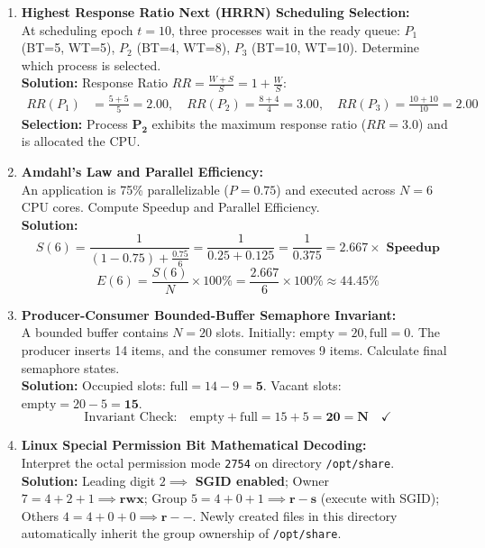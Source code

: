 \begin{enumerate}[label=\textbf{Problem \arabic*.},leftmargin=1.5cm]
\item \textbf{Highest Response Ratio Next (HRRN) Scheduling Selection:} \\
At scheduling epoch $t = 10$, three processes wait in the ready queue:
$P_1$ (BT=5, WT=5), $P_2$ (BT=4, WT=8), $P_3$ (BT=10, WT=10). Determine which process is selected. \\
\textbf{Solution:} Response Ratio $RR = \frac{W + S}{S} = 1 + \frac{W}{S}$:
\begin{align*}
RR(P_1) &= \frac{5 + 5}{5} = \mathbf{2.00}, \quad RR(P_2) = \frac{8 + 4}{4} = \mathbf{3.00}, \quad RR(P_3) = \frac{10 + 10}{10} = \mathbf{2.00}
\end{align*}
\textbf{Selection:} Process $\mathbf{P_2}$ exhibits the maximum response ratio ($RR = 3.0$) and is allocated the CPU.

\item \textbf{Amdahl's Law and Parallel Efficiency:} \\
An application is 75\% parallelizable ($P = 0.75$) and executed across $N = 6$ CPU cores. Compute Speedup and Parallel Efficiency. \\
\textbf{Solution:}
\[
S(6) = \frac{1}{(1 - 0.75) + \frac{0.75}{6}} = \frac{1}{0.25 + 0.125} = \frac{1}{0.375} = \mathbf{2.667\times\text{ Speedup}}
\]
\[
E(6) = \frac{S(6)}{N} \times 100\% = \frac{2.667}{6} \times 100\% \approx \mathbf{44.45\%}
\]

\item \textbf{Producer-Consumer Bounded-Buffer Semaphore Invariant:} \\
A bounded buffer contains $N = 20$ slots. Initially: $\text{empty} = 20, \text{full} = 0$. The producer inserts 14 items, and the consumer removes 9 items. Calculate final semaphore states. \\
\textbf{Solution:} Occupied slots: $\text{full} = 14 - 9 = \mathbf{5}$. Vacant slots: $\text{empty} = 20 - 5 = \mathbf{15}$.
\[
\text{Invariant Check:} \quad \text{empty} + \text{full} = 15 + 5 = \mathbf{20 = N} \quad \checkmark
\]

\item \textbf{Linux Special Permission Bit Mathematical Decoding:} \\
Interpret the octal permission mode \texttt{2754} on directory \texttt{/opt/share}. \\
\textbf{Solution:} Leading digit $2 \implies$ \textbf{SGID enabled}; Owner $7 = 4+2+1 \implies \mathbf{rwx}$; Group $5 = 4+0+1 \implies \mathbf{r-s}$ (execute with SGID); Others $4 = 4+0+0 \implies \mathbf{r--}$. Newly created files in this directory automatically inherit the group ownership of \texttt{/opt/share}.


\end{enumerate}
